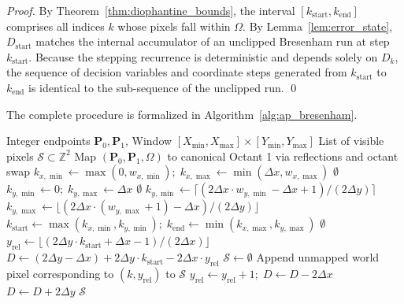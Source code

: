 \documentclass[runningheads]{llncs}
\begin{document}
\begin{proof}
By Theorem~\ref{thm:diophantine_bounds}, the interval $[k_{\mathrm{start}}, k_{\mathrm{end}}]$ comprises all indices $k$ whose pixels fall within $\Omega$. By Lemma~\ref{lem:error_state}, $D_{\mathrm{start}}$ matches the internal accumulator of an unclipped Bresenham run at step $k_{\mathrm{start}}$. Because the stepping recurrence is deterministic and depends solely on $D_k$, the sequence of decision variables and coordinate steps generated from $k_{\mathrm{start}}$ to $k_{\mathrm{end}}$ is identical to the sub-sequence of the unclipped run. \qed
\end{proof}

The complete procedure is formalized in Algorithm~\ref{alg:ap_bresenham}.

\begin{algorithm}[t]
\caption{AP-Bresenham Line Clipping}
\label{alg:ap_bresenham}
\begin{algorithmic}[1]
\REQUIRE Integer endpoints $\mathbf{P}_0, \mathbf{P}_1$, Window $[X_{\min}, X_{\max}] \times [Y_{\min}, Y_{\max}]$
\ENSURE List of visible pixels $\mathcal{S} \subset \mathbb{Z}^2$
\STATE Map $(\mathbf{P}_0, \mathbf{P}_1, \Omega)$ to canonical Octant 1 via reflections and octant swap
\STATE $k_{x,\min} \leftarrow \max(0, w_{x,\min}); \; k_{x,\max} \leftarrow \min(\Delta x, w_{x,\max})$
    \RETURN $\emptyset$ 
\ENDIF
{}
        \STATE $k_{y,\min} \leftarrow 0; \; k_{y,\max} \leftarrow \Delta x$
    \ELSE
        \RETURN $\emptyset$
    \ENDIF
\ELSE
    \STATE $k_{y,\min} \leftarrow \lceil (2\Delta x \cdot w_{y,\min} - \Delta x + 1) / (2\Delta y) \rceil$
    \STATE $k_{y,\max} \leftarrow \lfloor (2\Delta x \cdot (w_{y,\max} + 1) - \Delta x) / (2\Delta y) \rfloor$
\ENDIF
\STATE $k_{\mathrm{start}} \leftarrow \max(k_{x,\min}, k_{y,\min}); \; k_{\mathrm{end}} \leftarrow \min(k_{x,\max}, k_{y,\max})$
    \RETURN $\emptyset$ 
\ENDIF
\STATE $y_{\mathrm{rel}} \leftarrow \lfloor (2\Delta y \cdot k_{\mathrm{start}} + \Delta x - 1) / (2\Delta x) \rfloor$
\STATE $D \leftarrow (2\Delta y - \Delta x) + 2\Delta y \cdot k_{\mathrm{start}} - 2\Delta x \cdot y_{\mathrm{rel}}$
\STATE $\mathcal{S} \leftarrow \emptyset$
    \STATE Append unmapped world pixel corresponding to $(k, y_{\mathrm{rel}})$ to $\mathcal{S}$
        \STATE $y_{\mathrm{rel}} \leftarrow y_{\mathrm{rel}} + 1; \; D \leftarrow D - 2\Delta x$
    \ENDIF
    \STATE $D \leftarrow D + 2\Delta y$
\ENDFOR
\RETURN $\mathcal{S}$
\end{algorithmic}
\end{algorithm}
\end{document}
